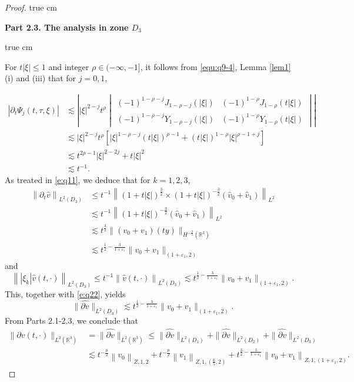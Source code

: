 \documentclass[11pt,twoside]{article}
\newcommand{\R}{\mathbb R}
\newcommand{\p}{\partial}
\newcommand{\f}{\frac}
\theoremstyle{plain}
\theoremstyle{definition}
\theoremstyle{remark}
\numberwithin{equation}{section}
\begin{document}
\begin{proof}
 true cm

{\bf Part 2.3.  The analysis  in zone $D_3$}

 true cm

For $t|\xi|\le 1$ and integer $\rho\in(-\infty,-1]$, it follows from \eqref{equ:q9-4}, Lemma \ref{lem1} (i) and (iii) that for $j=0,1$,

\begin{equation}\label{e:q21}
\begin{aligned}
|\p_t\Psi_j(t,\tau,\xi)|
&\lesssim \left| |\xi|^{2-j} t^{\rho}
\begin{vmatrix}
(-1)^{1-\rho-j}J_{1-\rho-j}(|\xi|) & (-1)^{1-\rho}J_{1-\rho}(t|\xi|) \\
(-1)^{1-\rho-j}Y_{1-\rho-j}(|\xi|) & (-1)^{1-\rho}Y_{1-\rho}(t|\xi|)
\end{vmatrix} \right|\\
&\lesssim |\xi|^{2-j} t^{\rho}\left[|\xi|^{1-\rho-j}(t|\xi|)^{\rho-1}+(t|\xi|)^{1-\rho}|\xi|^{\rho-1+j}\right]\\
&\lesssim t^{2\rho-1}|\xi|^{2-2j}+t|\xi|^2\\
&\lesssim t^{-1}.
\end{aligned}
\end{equation}
As treated in \eqref{e:q11}, we deduce that for $k=1, 2, 3$,
\begin{equation}\label{e:q22}
\begin{aligned}
\left\|\p_t\hat{v}\right\|_{L^2(D_3)} & \leq t^{-1}\left\|(1+t|\xi|)^{\f32}\times(1+t|\xi|)^{-\f32}(\hat{v}_{0}+\hat{v}_{1})\right\|_{L^{2}} \\
&\lesssim t^{-1}\left\|(1+t|\xi|)^{-\f32}(\hat{v}_{0}+\hat{v}_{1})\right\|_{L^{2}}\\
& \lesssim t^{\f32} \|(v_0+v_1)(ty)\|_{H^{-\f32}(\R^3)}\\
&\lesssim t^{\f12-\f{3}{1+\varepsilon_1}}\|v_0+v_1\|_{(1+\varepsilon_1, 2)}
\end{aligned}
\end{equation}
and
$$
\left\||\xi_k|\hat{v}(t, \cdot)\right\|_{L^2(D_3)}\leq t^{-1}\left\|\hat{v}(t, \cdot)\right\|_{L^2(D_3)} \lesssim t^{\f12-\f{3}{1+\varepsilon_1}}\|v_0+v_1\|_{(1+\varepsilon_1, 2)}.
$$
This, together with \eqref{e:q22}, yields
\begin{equation}\label{e:q23}
\|\widehat{\p v}\|_{L^2(D_3)}\lesssim t^{\f12-\f{3}{1+\varepsilon_1}}\|v_0+v_1\|_{(1+\varepsilon_1, 2)}.
\end{equation}
From Parts 2.1-2.3, we conclude that
\begin{equation}\label{e:q24}
\begin{aligned}
\|\p v(t, \cdot)\|_{L^2(\R^3)}&=\|\widehat{\p v}\|_{L^2(\R^3)} \leq\|\widehat{\p v}\|_{L^2(D_1)}
+\|\widehat{\p v}\|_{L^2(D_2)}+\|\widehat{\p v}\|_{L^2(D_3)}\\
& \lesssim t^{-\f{\mu}{2}}\left\|v_0\right\|_{Z, 1, 2}+t^{-\f{\mu}{2}}\left\|v_1\right\|_{Z, 1,(\f65, 2)}+t^{\f32-\f{3}{1+\varepsilon_1}}\left\|v_0+v_1\right\|_{Z, 1,(1+\varepsilon_1, 2)}.
\end{aligned}
\end{equation}




\end{proof}
\end{document}
